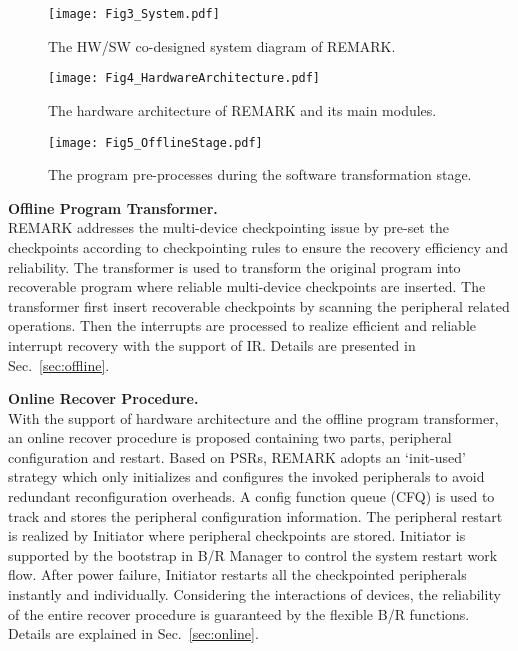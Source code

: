 \begin{figure*}[!htbp]
    \centering
    \texttt{[image: Fig3\_System.pdf]}
    \caption{The HW/SW co-designed system diagram of REMARK.}
    \label{fig:SystemArchitecture}
\end{figure*}

%
\begin{figure*}[!htpb]
    \centering
    \texttt{[image: Fig4\_HardwareArchitecture.pdf]}
    \caption{The hardware architecture of REMARK and its main modules. }
    \label{fig:HardwareArchitecture}
\end{figure*}

\begin{figure*}[!htbp]
    \centering
    \texttt{[image: Fig5\_OfflineStage.pdf]}
    \caption{The program pre-processes during the software transformation stage.}
    \label{fig:OfflineStage}
\end{figure*}

\vspace{5pt}
\noindent\textbf{Offline Program Transformer.} \\
REMARK addresses the multi-device checkpointing issue by pre-set the checkpoints according to checkpointing rules to ensure the recovery efficiency and reliability.
The transformer is used to transform the original program into recoverable program where reliable multi-device checkpoints are inserted.
The transformer first insert recoverable checkpoints by scanning the peripheral related operations.
Then the interrupts are processed to realize efficient and reliable interrupt recovery with the support of IR.
Details are presented in Sec.~\ref{sec:offline}.


\vspace{5pt}
\noindent\textbf{Online Recover Procedure.} \\
With the support of hardware architecture and the offline program transformer, an online recover procedure is proposed containing two parts, peripheral configuration and restart.
Based on PSRs, REMARK adopts an `init-used' strategy which only initializes and configures the invoked peripherals to avoid redundant reconfiguration overheads.
A config function queue (CFQ) is used to track and stores the peripheral configuration information.
The peripheral restart is realized by Initiator where peripheral checkpoints are stored.
Initiator is supported by the bootstrap in B/R Manager to control the system restart work flow.
After power failure, Initiator restarts all the checkpointed peripherals instantly and individually.
Considering the interactions of devices, the reliability of the entire recover procedure is guaranteed by the flexible B/R functions.
Details are explained in Sec.~\ref{sec:online}.




